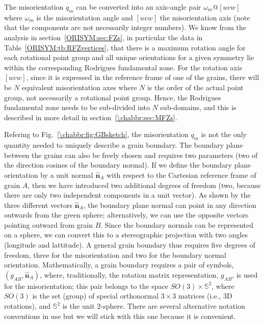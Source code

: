 The misorientation $q_m$ can be converted into an axis-angle pair $\omega_m@[uvw]$ where $\omega_m$ is the misorientation angle and $[uvw]$ the misorientation axis (note that the components are not necessarily integer numbers).  We know from the analysis in section~\ref{ORISYM:sec:FZs}, in particular the data in Table~\ref{ORISYM:tb:RFZvertices}, that there is a maximum rotation angle for each rotational point group and all unique orientations for a given symmetry lie within the corresponding Rodrigues fundamental zone. For the rotation axis $[uvw]$, since it is expressed in the reference frame of one of the grains, there will be $N$ equivalent misorientation axes where $N$ is the order of the actual point group, not necessarily a rotational point group.  Hence, the Rodrigues fundamental zone needs to be sub-divided into $N$ sub-domains, and this is described in more detail in section~\ref{\chabbr:sec:MFZs}.

Refering to Fig.~\ref{\chabbr:fig:GBsketch}, the misorientation $q_m$ is not the only quantity needed to uniquely describe a grain boundary.  The boundary plane between the grains can also be freely chosen and requires two parameters (two of the direction cosines of the boundary normal).   If we define the boundary plane orientation by a unit normal $\hat{\mathbf{n}}_A$ with respect to the Cartesian reference frame of grain $A$, then we have introduced two additional degrees of freedom (two, because there are only two independent components in a unit vector).  As shown by the three different vectors $\hat{\mathbf{n}}_A$, the boundary plane normal can point in any direction outwards from the green sphere; alternatively, we can use the opposite vectors pointing outward from grain $B$.  Since the boundary normals can be represented on a sphere, we can convert this to a stereographic projection with two angles (longitude and lattitude).  A general grain boundary thus requires five degrees of freedom, three for the misorientation and two for the boundary normal orientation.  Mathematically, a grain boundary requires a pair of symbols, $(g_{AB}, \hat{\mathbf{n}}_A)$, where, traditionally, the rotation matrix representation, $g_{AB}$, is used for the misorientation; this pair belongs to the space $SO(3)\times \mathbb{S}^2$, where $SO(3)$ is the set (group) of special orthonormal $3\times 3$ matrices (i.e., 3D rotations), and $\mathbb{S}^2$ is the unit $2$-sphere.  There are several alternative notation conventions in use but we will stick with this one because it is convenient.

